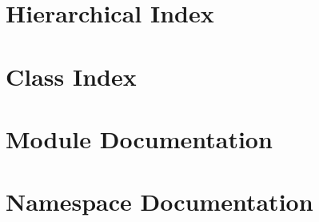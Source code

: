 \let\mypdfximage\pdfximage\def\pdfximage{\immediate\mypdfximage}\documentclass[twoside]{book}
\newcommand{\+}{\discretionary{\mbox{\scriptsize$\hookleftarrow$}}{}{}}
\begin{document}
\chapter{Hierarchical Index}

\chapter{Class Index}

\chapter{Module Documentation}














\chapter{Namespace Documentation}













\end{document}
